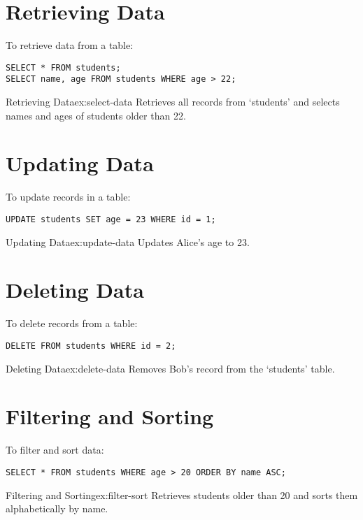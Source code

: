 \section{Retrieving Data}

To retrieve data from a table:

\begin{verbatim}
SELECT * FROM students;
SELECT name, age FROM students WHERE age > 22;
\end{verbatim}

\begin{exampletcb}{Retrieving Data}{ex:select-data}
Retrieves all records from `students' and selects names and ages of students older than 22.
\end{exampletcb}

\section{Updating Data}

To update records in a table:

\begin{verbatim}
UPDATE students SET age = 23 WHERE id = 1;
\end{verbatim}

\begin{exampletcb}{Updating Data}{ex:update-data}
Updates Alice's age to 23.
\end{exampletcb}

\section{Deleting Data}

To delete records from a table:

\begin{verbatim}
DELETE FROM students WHERE id = 2;
\end{verbatim}

\begin{exampletcb}{Deleting Data}{ex:delete-data}
Removes Bob's record from the `students' table.
\end{exampletcb}

\section{Filtering and Sorting}

To filter and sort data:

\begin{verbatim}
SELECT * FROM students WHERE age > 20 ORDER BY name ASC;
\end{verbatim}

\begin{exampletcb}{Filtering and Sorting}{ex:filter-sort}
Retrieves students older than 20 and sorts them alphabetically by name.
\end{exampletcb}
